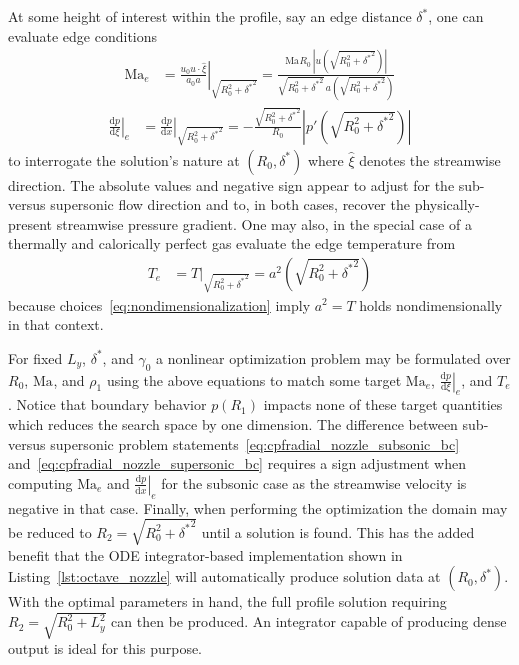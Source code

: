 \documentclass[letterpaper,11pt,nointlimits,reqno]{amsart}
\newcommand{\Mach}[1][]{\ensuremath{\mbox{Ma}_{#1}}}
\begin{document}
At some height of interest within the profile, say an edge distance
$\delta^\ast$, one can evaluate edge conditions
\begin{align}
  \Mach[e]{}
  &=
  \left.
    \frac{u_0 u\cdot\hat{\xi}}{a_0 a}
  \right|_{\sqrt{R_0^2 + {\delta^\ast}^2}}
  =
  \frac{\Mach R_0 \, \left|u\!\left(\sqrt{R_0^2 + {\delta^\ast}^2}\right)\right|}
       {\sqrt{R_0^2+{\delta^\ast}^2} \, a\!\left(\sqrt{R_0^2 + {\delta^\ast}^2}\right)}
\end{align}
\begin{align}
  \left.
    \frac{\mathrm{d}p}{\mathrm{d}\xi}
  \right|_e
  &=
  \left.
    \frac{\mathrm{d}p}{\mathrm{d}x}
  \right|_{\sqrt{R_0^2 + {\delta^\ast}^2}}
  =
  -\frac{\sqrt{R_0^2+{\delta^\ast}^2}}{R_0}
  \left|p'\!\left(\sqrt{R_0^2 + {\delta^\ast}^2}\right)\right|
\end{align}
to interrogate the solution's nature at $\left(R_0, \delta^\ast\right)$ where
$\hat{\xi}$ denotes the streamwise direction.  The absolute values and negative
sign appear to adjust for the sub- versus supersonic flow direction and to, in
both cases, recover the physically-present streamwise pressure gradient.  One
may also, in the special case of a thermally and calorically perfect gas
evaluate the edge temperature from
\begin{align}
  T_e
  &=
    T
  \bigr|_{\sqrt{R_0^2 + {\delta^\ast}^2}}
  =
  a^2\!\left(\sqrt{R_0^2 + {\delta^\ast}^2}\right)
\end{align}
because choices~\eqref{eq:nondimensionalization} imply $a^2 = T$ holds
nondimensionally in that context.

For fixed $L_y$, $\delta^\ast$, and $\gamma_0$ a nonlinear optimization problem
may be formulated over $R_0$, $\Mach$, and $\rho_1$ using the above equations
to match some target $\Mach[e]{}$,
$\left.\frac{\mathrm{d}p}{\mathrm{d}\xi}\right|_e$, and $T_e$.  Notice that
boundary behavior $p\!\left(R_1\right)$ impacts none of these target quantities
which reduces the search space by one dimension.  The difference between sub-
versus supersonic problem statements~\eqref{eq:cpfradial_nozzle_subsonic_bc}
and~\eqref{eq:cpfradial_nozzle_supersonic_bc} requires a sign adjustment when
computing $\Mach[e]{}$ and $\left.\frac{\mathrm{d}p}{\mathrm{d}x}\right|_e$ for
the subsonic case as the streamwise velocity is negative in that case.
Finally, when performing the optimization the domain may be reduced to $R_2 =
\sqrt{R_0^2 + {\delta^\ast}^2}$ until a solution is found.  This has the added
benefit that the ODE integrator-based implementation shown in
Listing~\ref{lst:octave_nozzle} will automatically produce solution data at
$\left(R_0,\delta^\ast\right)$.  With the optimal parameters in hand, the full
profile solution requiring $R_2 = \sqrt{R_0^2 + L_y^2}$ can then be produced.
An integrator capable of producing dense output is ideal for this purpose.

\newcommand*{\doi}[1]{\href{http://dx.doi.org/\detokenize{#1}}{doi: #1}}


\end{document}
